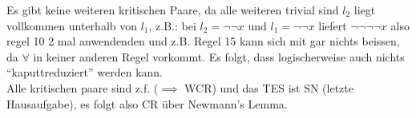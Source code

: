 \documentclass{article}
\begin{document}
	Es gibt keine weiteren kritischen Paare, da alle weiteren trivial sind $l_2$ liegt vollkommen unterhalb von $l_1$, z.B.: bei $l_2=\lnot \lnot x$ und $l_1=\lnot \lnot x$ liefert $\lnot \lnot \lnot \lnot x$ also regel 10 2 mal anwendenden und z.B. Regel 15 kann sich mit gar nichts beissen, da $\forall$ in keiner anderen Regel vorkommt. Es folgt, dass logischerweise auch nichts ``kaputtreduziert'' werden kann.\\
	Alle kritischen paare sind z.f. ($\implies$ WCR) und das TES ist SN (letzte Hausaufgabe), es folgt also CR über Newmann's Lemma.\\
\end{document}
